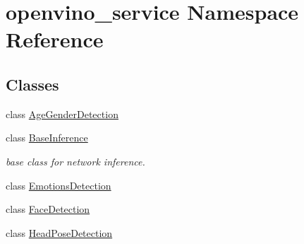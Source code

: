 \hypertarget{namespaceopenvino__service}{}\section{openvino\+\_\+service Namespace Reference}
\label{namespaceopenvino__service}
\subsection*{Classes}
\begin{DoxyCompactItemize}
\item 
class \hyperlink{classopenvino__service_1_1AgeGenderDetection}{Age\+Gender\+Detection}
\item 
class \hyperlink{classopenvino__service_1_1BaseInference}{Base\+Inference}
\begin{DoxyCompactList}\small\item\em base class for network inference. \end{DoxyCompactList}\item 
class \hyperlink{classopenvino__service_1_1EmotionsDetection}{Emotions\+Detection}
\item 
class \hyperlink{classopenvino__service_1_1FaceDetection}{Face\+Detection}
\item 
class \hyperlink{classopenvino__service_1_1HeadPoseDetection}{Head\+Pose\+Detection}
\end{DoxyCompactItemize}

